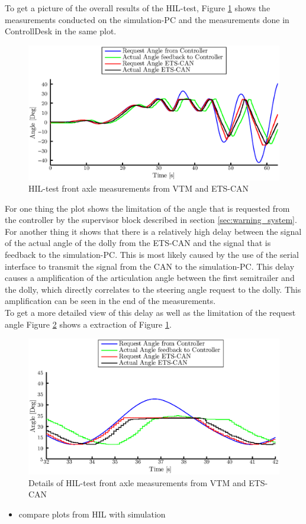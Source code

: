 \documentclass[ExampleMasters.tex]{subfiles}
\begin{document}
To get a picture of the overall results of the HIL-test, Figure \ref{fig:HIL002_complete} shows the measurements conducted on the simulation-PC and the measurements done in ControllDesk in the same plot.  
\begin{figure}[!htb]
	\centering
	\includegraphics[width=1\linewidth]{figures/HIL002_alles}
	\caption{HIL-test front axle measurements from VTM and ETS-CAN}	
	\label{fig:HIL002_complete}
\end{figure}

For one thing the plot shows the limitation of the angle that is requested from the controller by the supervisor block described in section \ref{sec:warning_system}. For another thing it shows that there is a relatively high delay between the signal of the actual angle of the dolly from the ETS-CAN and the signal that is feedback to the simulation-PC. This is most likely caused by the use of the serial interface to transmit the signal from the CAN to the simulation-PC. This delay causes a amplification of the articulation angle between the first semitrailer and the dolly, which directly correlates to the steering angle request to the dolly. This amplification can be seen in the end of the measurements.\\
To get a more detailed view of this delay as well as the limitation of the request angle Figure \ref{fig:HIL002_complete_details} shows a extraction of Figure \ref{fig:HIL002_complete}.   

\begin{figure}[!htb]
	\centering
	\includegraphics[width=1\linewidth]{figures/HIL002_alles_details}
	\caption{Details of HIL-test front axle measurements from VTM and ETS-CAN}
	
	\label{fig:HIL002_complete_details}
\end{figure}



\begin{itemize}
	\item compare plots from \gls{HIL}  with simulation
\end{itemize}
\end{document}
